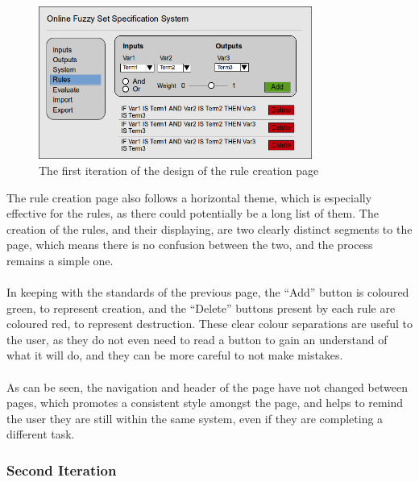 \begin{figure}[ht!]	
\begin{center}
\includegraphics[width=0.8\textwidth]{images/firstItRules}
\end{center}
\vspace{-5mm}	
\caption{The first iteration of the design of the rule creation page}
\label{fig:design-firstIterationRules}
\end{figure}
\noindent 
The rule creation page also follows a horizontal theme, which is especially effective for the rules, as there could potentially be a long list of them. The creation of the rules, and their displaying, are two clearly distinct segments to the page, which means there is no confusion between the two, and the process remains a simple one.\ \\
\ \\
In keeping with the standards of the previous page, the ``Add'' button is coloured green, to represent creation, and the ``Delete'' buttons present by each rule are coloured red, to represent destruction. These clear colour separations are useful to the user, as they do not even need to read a button to gain an understand of what it will do, and they can be more careful to not make mistakes.\ \\
\ \\
As can be seen, the navigation and header of the page have not changed between pages, which promotes a consistent style amongst the page, and helps to remind the user they are still within the same system, even if they are completing a different task. 

\subsubsection{Second Iteration}

